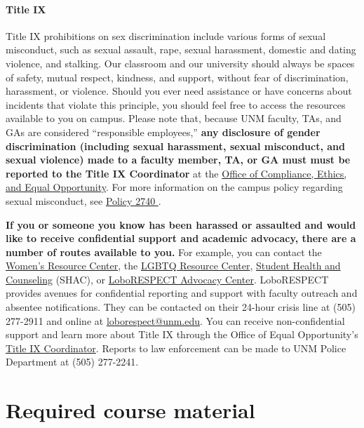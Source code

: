 \documentclass[11pt]{article}
\begin{document}
\paragraph{Title IX} Title IX prohibitions on sex discrimination include various forms of sexual misconduct, such as sexual assault, rape, sexual harassment, domestic and dating violence, and stalking. Our classroom and our university should always be spaces of safety, mutual respect, kindness, and support, without fear of discrimination, harassment, or violence. Should you ever need assistance or have concerns about incidents that violate this principle, you should feel free to access the resources available to you on campus. Please note that, because UNM faculty, TAs, and GAs are considered ``responsible employees,'' \textbf{any disclosure of gender discrimination (including sexual harassment, sexual misconduct, and sexual violence) made to a faculty member, TA, or GA must must be reported to the Title IX Coordinator }at the \href{https://oeo.unm.edu/title-ix/title-ix-reporting-obligations.html}{Office of Compliance, Ethics, and Equal Opportunity}. For more information on the campus policy regarding sexual misconduct, see \href{https://policy.unm.edu/university-policies/2000/2740.html}{Policy 2740
}.\vspace{10pt}

\noindent \textbf{If you or someone you know has been harassed or assaulted and would like to receive confidential support and academic advocacy, there are a number of routes available to you.} For example, you can contact the \href{https://women.unm.edu/}{Women's Resource Center}, the \href{https://lgbtqrc.unm.edu/}{LGBTQ Resource Center}, \href{http://shac.unm.edu/}{Student Health and Counseling} (SHAC), or \href{https://loborespect.unm.edu/}{LoboRESPECT Advocacy Center}. LoboRESPECT provides avenues for confidential reporting and support with faculty outreach and absentee notifications. They can be contacted on their 24-hour crisis line at (505) 277-2911 and online at \href{loborespect@unm.edu}{loborespect@unm.edu}. You can receive non-confidential support and learn more about Title IX through the Office of Equal Opportunity's \href{http://oeo.unm.edu/title-ix/}{Title IX Coordinator}. Reports to law enforcement can be made to UNM Police Department at (505) 277-2241.

\clearpage \section*{Required course material}
\end{document}
